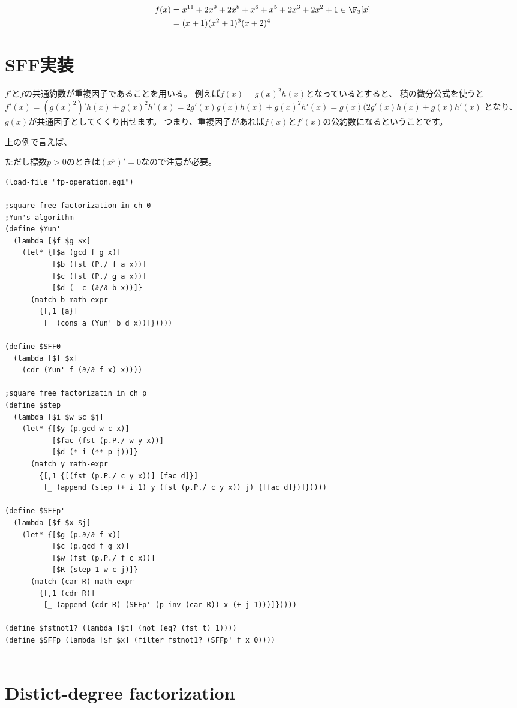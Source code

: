 \documentclass[uplatex]{jsarticle}
\begin{document}
\begin{align*}
f(x)&=x^{11}+2x^9+2x^8+x^6+x^5+2x^3+2x^2+1 \in \F_3[x]\\
&=(x+1)(x^2+1)^3(x+2)^4
\end{align*}

\section{SFF実装}

$f'$と$f$の共通約数が重複因子であることを用いる。
例えば$f(x)=g(x)^2h(x)$となっているとすると、
積の微分公式を使うと$f'(x)=(g(x)^2)'h(x)+g(x)^2h'(x)=2g'(x)g(x)h(x)+g(x)^2h'(x)=g(x)(2g'(x)h(x)+g(x)h'(x)$
となり、$g(x)$が共通因子としてくくり出せます。
つまり、重複因子があれば$f(x)$と$f'(x)$の公約数になるということです。

上の例で言えば、

ただし標数$p>0$のときは$(x^p)'=0$なので注意が必要。

{\footnotesize
\begin{verbatim}
(load-file "fp-operation.egi")

;square free factorization in ch 0
;Yun's algorithm
(define $Yun'
  (lambda [$f $g $x]
    (let* {[$a (gcd f g x)]
           [$b (fst (P./ f a x))]
           [$c (fst (P./ g a x))]
           [$d (- c (∂/∂ b x))]}
      (match b math-expr
        {[,1 {a}]
         [_ (cons a (Yun' b d x))]}))))

(define $SFF0
  (lambda [$f $x]
    (cdr (Yun' f (∂/∂ f x) x))))

;square free factorizatin in ch p
(define $step
  (lambda [$i $w $c $j]
    (let* {[$y (p.gcd w c x)]
           [$fac (fst (p.P./ w y x))]
           [$d (* i (** p j))]}
      (match y math-expr
        {[,1 {[(fst (p.P./ c y x))] [fac d]}]
         [_ (append (step (+ i 1) y (fst (p.P./ c y x)) j) {[fac d]})]}))))

(define $SFFp'
  (lambda [$f $x $j]
    (let* {[$g (p.∂/∂ f x)]
           [$c (p.gcd f g x)]
           [$w (fst (p.P./ f c x))]
           [$R (step 1 w c j)]}
      (match (car R) math-expr
        {[,1 (cdr R)]
         [_ (append (cdr R) (SFFp' (p-inv (car R)) x (+ j 1)))]}))))

(define $fstnot1? (lambda [$t] (not (eq? (fst t) 1))))
(define $SFFp (lambda [$f $x] (filter fstnot1? (SFFp' f x 0))))
    
\end{verbatim}
}


\section{Distict-degree factorization}
\end{document}
